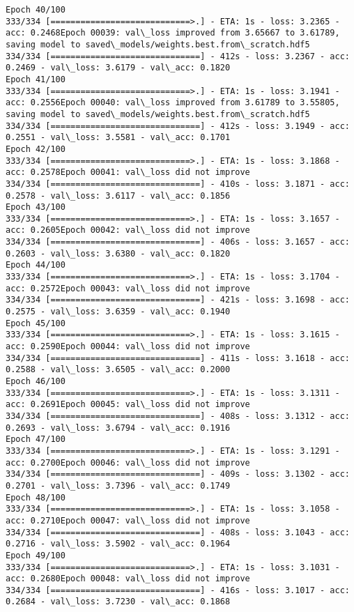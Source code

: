 \documentclass[11pt]{article}
\begin{document}
\begin{Verbatim}[commandchars=\\\{\}]
Epoch 40/100
333/334 [============================>.] - ETA: 1s - loss: 3.2365 - acc: 0.2468Epoch 00039: val\_loss improved from 3.65667 to 3.61789, saving model to saved\_models/weights.best.from\_scratch.hdf5
334/334 [==============================] - 412s - loss: 3.2367 - acc: 0.2469 - val\_loss: 3.6179 - val\_acc: 0.1820
Epoch 41/100
333/334 [============================>.] - ETA: 1s - loss: 3.1941 - acc: 0.2556Epoch 00040: val\_loss improved from 3.61789 to 3.55805, saving model to saved\_models/weights.best.from\_scratch.hdf5
334/334 [==============================] - 412s - loss: 3.1949 - acc: 0.2551 - val\_loss: 3.5581 - val\_acc: 0.1701
Epoch 42/100
333/334 [============================>.] - ETA: 1s - loss: 3.1868 - acc: 0.2578Epoch 00041: val\_loss did not improve
334/334 [==============================] - 410s - loss: 3.1871 - acc: 0.2578 - val\_loss: 3.6117 - val\_acc: 0.1856
Epoch 43/100
333/334 [============================>.] - ETA: 1s - loss: 3.1657 - acc: 0.2605Epoch 00042: val\_loss did not improve
334/334 [==============================] - 406s - loss: 3.1657 - acc: 0.2603 - val\_loss: 3.6380 - val\_acc: 0.1820
Epoch 44/100
333/334 [============================>.] - ETA: 1s - loss: 3.1704 - acc: 0.2572Epoch 00043: val\_loss did not improve
334/334 [==============================] - 421s - loss: 3.1698 - acc: 0.2575 - val\_loss: 3.6359 - val\_acc: 0.1940
Epoch 45/100
333/334 [============================>.] - ETA: 1s - loss: 3.1615 - acc: 0.2590Epoch 00044: val\_loss did not improve
334/334 [==============================] - 411s - loss: 3.1618 - acc: 0.2588 - val\_loss: 3.6505 - val\_acc: 0.2000
Epoch 46/100
333/334 [============================>.] - ETA: 1s - loss: 3.1311 - acc: 0.2691Epoch 00045: val\_loss did not improve
334/334 [==============================] - 408s - loss: 3.1312 - acc: 0.2693 - val\_loss: 3.6794 - val\_acc: 0.1916
Epoch 47/100
333/334 [============================>.] - ETA: 1s - loss: 3.1291 - acc: 0.2700Epoch 00046: val\_loss did not improve
334/334 [==============================] - 409s - loss: 3.1302 - acc: 0.2701 - val\_loss: 3.7396 - val\_acc: 0.1749
Epoch 48/100
333/334 [============================>.] - ETA: 1s - loss: 3.1058 - acc: 0.2710Epoch 00047: val\_loss did not improve
334/334 [==============================] - 408s - loss: 3.1043 - acc: 0.2716 - val\_loss: 3.5902 - val\_acc: 0.1964
Epoch 49/100
333/334 [============================>.] - ETA: 1s - loss: 3.1031 - acc: 0.2680Epoch 00048: val\_loss did not improve
334/334 [==============================] - 416s - loss: 3.1017 - acc: 0.2684 - val\_loss: 3.7230 - val\_acc: 0.1868

\end{Verbatim}
\end{document}
